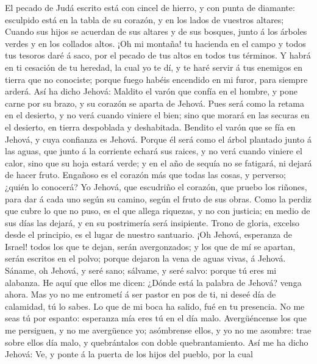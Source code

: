  El pecado de Judá escrito está con cincel de hierro, y con
punta de diamante: esculpido está en la tabla de su corazón, y en los
lados de vuestros altares;  Cuando sus hijos se acuerdan de
sus altares y de sus bosques, junto á los árboles verdes y en los
collados altos.  ¡Oh mi montaña! tu hacienda en el campo y
todos tus tesoros daré á saco, por el pecado de tus altos en todos tus
términos.  Y habrá en ti cesación de tu heredad, la cual yo
te dí, y te haré servir á tus enemigos en tierra que no conociste;
porque fuego habéis encendido en mi furor, para siempre arderá.
 Así ha dicho Jehová: Maldito el varón que confía en el
hombre, y pone carne por su brazo, y su corazón se aparta de Jehová.
 Pues será como la retama en el desierto, y no verá cuando
viniere el bien; sino que morará en las securas en el desierto, en
tierra despoblada y deshabitada.  Bendito el varón que se
fía en Jehová, y cuya confianza es Jehová.  Porque él será
como el árbol plantado junto á las aguas, que junto á la corriente
echará sus raices, y no verá cuando viniere el calor, sino que su hoja
estará verde; y en el año de sequía no se fatigará, ni dejará de hacer
fruto.  Engañoso es el corazón más que todas las cosas, y
perverso; ¿quién lo conocerá?  Yo Jehová, que escudriño el
corazón, que pruebo los riñones, para dar á cada uno según su camino,
según el fruto de sus obras.  Como la perdiz que cubre lo
que no puso, es el que allega riquezas, y no con justicia; en medio de
sus días las dejará, y en su postrimería será insipiente. 
Trono de gloria, excelso desde el principio, es el lugar de nuestro
santuario.  ¡Oh Jehová, esperanza de Israel! todos los que
te dejan, serán avergonzados; y los que de mí se apartan, serán escritos
en el polvo; porque dejaron la vena de aguas vivas, á Jehová.
 Sáname, oh Jehová, y seré sano; sálvame, y seré salvo:
porque tú eres mi alabanza.  He aquí que ellos me dicen:
¿Dónde está la palabra de Jehová? venga ahora.  Mas yo no
me entrometí á ser pastor en pos de ti, ni deseé día de calamidad, tú lo
sabes. Lo que de mi boca ha salido, fué en tu presencia. 
No me seas tú por espanto: esperanza mía eres tú en el día malo.
 Avergüéncense los que me persiguen, y no me avergüence yo;
asómbrense ellos, y yo no me asombre: trae sobre ellos día malo, y
quebrántalos con doble quebrantamiento.  Así me ha dicho
Jehová: Ve, y ponte á la puerta de los hijos del pueblo, por la cual
